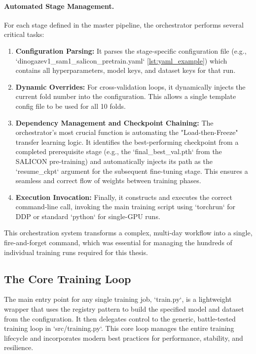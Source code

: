 \paragraph{Automated Stage Management.} For each stage defined in the master pipeline, the orchestrator performs several critical tasks:
\begin{enumerate}
    \item \textbf{Configuration Parsing:} It parses the stage-specific configuration file (e.g., `dinogazev1\_sam1\_salicon\_pretrain.yaml` \cref{lst:yaml_example}) which contains all hyperparameters, model keys, and dataset keys for that run.
    \item \textbf{Dynamic Overrides:} For cross-validation loops, it dynamically injects the current fold number into the configuration. This allows a single template config file to be used for all 10 folds.
    \item \textbf{Dependency Management and Checkpoint Chaining:} The orchestrator's most crucial function is automating the "Load-then-Freeze" transfer learning logic. It identifies the best-performing checkpoint from a completed prerequisite stage (e.g., the `final\_best\_val.pth` from the SALICON pre-training) and automatically injects its path as the `resume\_ckpt` argument for the subsequent fine-tuning stage. This ensures a seamless and correct flow of weights between training phases.
    \item \textbf{Execution Invocation:} Finally, it constructs and executes the correct command-line call, invoking the main training script using `torchrun` for DDP or standard `python` for single-GPU runs.
\end{enumerate}
This orchestration system transforms a complex, multi-day workflow into a single, fire-and-forget command, which was essential for managing the hundreds of individual training runs required for this thesis.

\subsection{The Core Training Loop}
The main entry point for any single training job, `train.py`, is a lightweight wrapper that uses the registry pattern to build the specified model and dataset from the configuration. It then delegates control to the generic, battle-tested training loop in `src/training.py`. This core loop manages the entire training lifecycle and incorporates modern best practices for performance, stability, and resilience.

